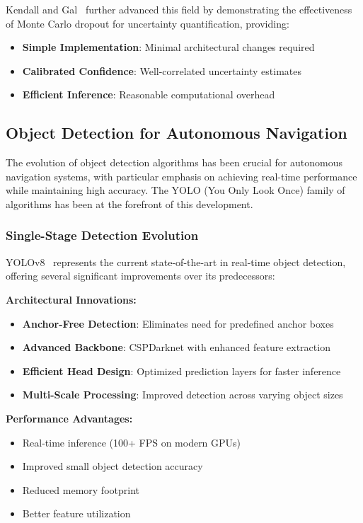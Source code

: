 \documentclass[12pt,oneside]{book}
\begin{document}
Kendall and Gal~\cite{kendall2017uncertainties} further advanced this field by demonstrating the effectiveness of Monte Carlo dropout for uncertainty quantification, providing:

\begin{itemize}
    \item \textbf{Simple Implementation}: Minimal architectural changes required
    \item \textbf{Calibrated Confidence}: Well-correlated uncertainty estimates
    \item \textbf{Efficient Inference}: Reasonable computational overhead
\end{itemize}

\subsection{Object Detection for Autonomous Navigation}

The evolution of object detection algorithms has been crucial for autonomous navigation systems, with particular emphasis on achieving real-time performance while maintaining high accuracy. The YOLO (You Only Look Once) family of algorithms has been at the forefront of this development.

\subsubsection{Single-Stage Detection Evolution}
YOLOv8~\cite{jocher2023ultralytics} represents the current state-of-the-art in real-time object detection, offering several significant improvements over its predecessors:

\textbf{Architectural Innovations:}
\begin{itemize}
    \item \textbf{Anchor-Free Detection}: Eliminates need for predefined anchor boxes
    \item \textbf{Advanced Backbone}: CSPDarknet with enhanced feature extraction
    \item \textbf{Efficient Head Design}: Optimized prediction layers for faster inference
    \item \textbf{Multi-Scale Processing}: Improved detection across varying object sizes
\end{itemize}

\textbf{Performance Advantages:}
\begin{itemize}
    \item Real-time inference (100+ FPS on modern GPUs)
    \item Improved small object detection accuracy
    \item Reduced memory footprint
    \item Better feature utilization
\end{itemize}
\end{document}
